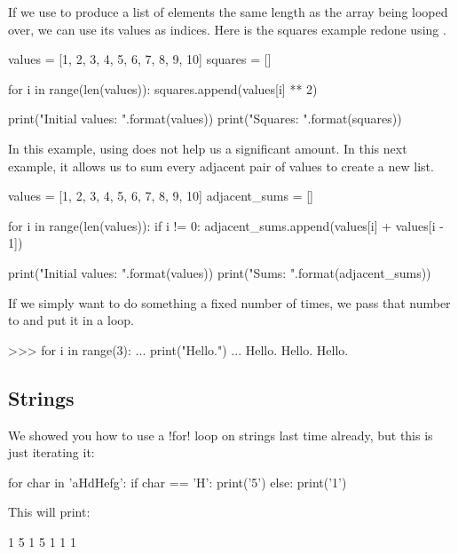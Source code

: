 \documentclass[11pt]{cselabheader}
\begin{document}
If we use  to produce a list of elements the same length as the
array being looped over, we can use its values as indices. Here is the squares
example redone using .

\begin{python3code}
values = [1, 2, 3, 4, 5, 6, 7, 8, 9, 10]
squares = []

for i in range(len(values)):
    squares.append(values[i] ** 2)

print("Initial values: {}".format(values))
print("Squares: {}".format(squares))
\end{python3code}

In this example, using  does not help us a significant amount.
In this next example, it allows us to sum every adjacent pair of values to
create a new list.

\begin{python3code}
values = [1, 2, 3, 4, 5, 6, 7, 8, 9, 10]
adjacent_sums = []

for i in range(len(values)):
    if i != 0:
        adjacent_sums.append(values[i] + values[i - 1])

print("Initial values: {}".format(values))
print("Sums: {}".format(adjacent_sums))
\end{python3code}

If we simply want to do something a fixed number of times, we pass that number
to  and put it in a loop.

\begin{pyconcode}
>>> for i in range(3):
...     print("Hello.")
...
Hello.
Hello.
Hello.
\end{pyconcode}

\subsection{Strings}

We showed you how to use a \pythoninline!for! loop on strings last time already,
but this is just iterating it:

\begin{python3code}
for char in 'aHdHefg':
    if char == 'H':
        print('5')
    else:
        print('1')
\end{python3code}

This will print:

\begin{verbatimcode}
1
5
1
5
1
1
1
\end{verbatimcode}
\end{document}
